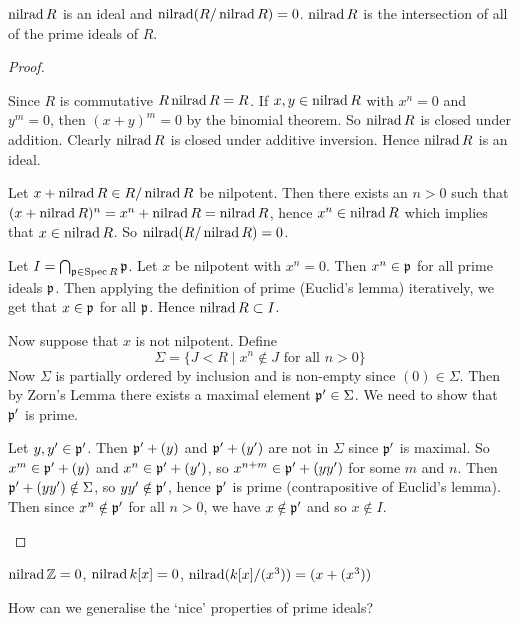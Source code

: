 \begin{prop}[0.12]
	\begin{enum}
		\io $\operatorname{nilrad} R$ is an ideal and $\operatorname{nilrad}(R/\operatorname{nilrad} R)=0$.
		\io $\operatorname{nilrad} R$ is the intersection of all of the prime ideals of $R$.
	\end{enum}
\end{prop}

\begin{proof}
	\begin{enum}
		\io Since $R$ is commutative $R \operatorname{nilrad} R = R$.
		If $x,y \in \operatorname{nilrad} R$ with $x^n=0$ and $y^m=0$, then $(x+y)^m=0$ by the binomial theorem.
		So $\operatorname{nilrad} R$ is closed under addition.
		Clearly $\operatorname{nilrad} R$ is closed under additive inversion.
		Hence $\operatorname{nilrad} R$ is an ideal.
		
		Let $x+\operatorname{nilrad} R \in R/\operatorname{nilrad} R$ be nilpotent.
		Then there exists an $n > 0$ such that $(x+\operatorname{nilrad} R)^n = x^n + \operatorname{nilrad} R = \operatorname{nilrad} R$, hence $x^n \in \operatorname{nilrad} R$ which implies that $x \in \operatorname{nilrad} R$.
		So $\operatorname{nilrad}(R/\operatorname{nilrad} R)=0$.
		
		\io Let $I = \bigcap_{\mathfrak p \in \operatorname{Spec} R} \mathfrak p$.
		Let $x$ be nilpotent with $x^n=0$.
		Then $x^n \in \mathfrak p$ for all prime ideals $\mathfrak p$.
		Then applying the definition of prime (Euclid's lemma) iteratively, we get that $x \in \mathfrak p$ for all $\mathfrak p$.
		Hence $\operatorname{nilrad} R \subset I$.
		
		Now suppose that $x$ is not nilpotent.
		Define
		\[\Sigma = \{J<R \mid x^n \notin J \text{ for all } n>0\}\]
		Now $\Sigma$ is partially ordered by inclusion and is non-empty since $(0) \in \Sigma$.
		Then by Zorn's Lemma there exists a maximal element $\mathfrak p' \in \Sigma$.
		We need to show that $\mathfrak p'$ is prime.
		
		Let $y,y' \in \mathfrak p'$.
		Then $\mathfrak p'+(y)$ and $\mathfrak p'+(y')$ are not in $\Sigma$ since $\mathfrak p'$ is maximal.
		So $x^m \in \mathfrak p'+(y)$ and $x^n \in \mathfrak p' + (y')$, so $x^{n+m} \in \mathfrak p' + (yy')$ for some $m$ and $n$.
		Then $\mathfrak p' + (yy') \notin \Sigma$, so $yy' \notin \mathfrak p'$, hence $\mathfrak p'$ is prime (contrapositive of Euclid's lemma).
		Then since $x^n \notin \mathfrak p'$ for all $n>0$, we have $x \notin \mathfrak p'$ and so $x \notin I$.
		\qedhere
	\end{enum}
\end{proof}

\begin{exam}
	$\operatorname{nilrad} \mathbb{Z} = 0$, $\operatorname{nilrad} k[x] = 0$, $\operatorname{nilrad}(k[x]/(x^3))=(x+(x^3))$
\end{exam}

How can we generalise the `nice' properties of prime ideals?


